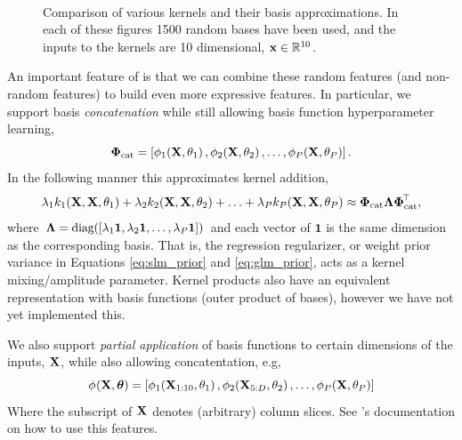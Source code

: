 \documentclass[11pt, oneside]{article}
\begin{document}
\begin{figure}[htb]
{        \label{fig:matern32}
    }
    \\
    \caption{Comparison of various kernels and their basis approximations. In
        each of these figures 1500 random bases have been used, and the inputs
        to the kernels are 10 dimensional, $\inss \in \real{10}$.}
    \label{fig:kerns}
\end{figure}

An important feature of \revrand{} is that we can combine these random features
(and non-random features) to build even more expressive features. In
particular, we support basis \emph{concatenation} while still allowing basis
function hyperparameter learning,
\begin{equation}
    \feat_{\text{cat}} = \sbrac{
        \func{\featsym}{\ins, \param_1}{1},
        \func{\featsym}{\ins, \param_2}{2},
        \ldots,
        \func{\featsym}{\ins, \param_P}{P}
    }.
\end{equation}
In the following manner this approximates kernel addition,
\begin{equation}
    \reg_1 \kernl_1\!\brac{\ins, \ins, \param_1} +
    \reg_2 \kernl_2\!\brac{\ins, \ins, \param_2} + \ldots +
    \reg_P \kernl_P\!\brac{\ins, \ins, \param_P} \approx
    \feat_{\text{cat}} \Reg \feat_{\text{cat}}\T,
\end{equation}
where $\Reg = \diag{\sbrac{\reg_1 \mathbf{1}, \reg_2 \mathbf{1}, \ldots, \reg_P
        \mathbf{1}}}$ and each vector of $\mathbf{1}$ is the same dimension as
the corresponding basis. That is, the regression regularizer, or weight prior
variance in Equations \eqref{eq:slm_prior} and \eqref{eq:glm_prior}, acts as a
kernel mixing/amplitude parameter.  Kernel products also have an equivalent
representation with basis functions (outer product of bases), however we have
not yet implemented this.

We also support \emph{partial application} of basis functions to certain
dimensions of the inputs, $\ins$, while also allowing concatentation, e.g,
\begin{equation}
    \func{\featsym}{\ins, \boldsymbol\param}{} = \sbrac{
        \func{\featsym}{\ins_{1:10}, \param_1}{1},
        \func{\featsym}{\ins_{5:D}, \param_2}{2},
        \ldots,
        \func{\featsym}{\ins, \param_P}{P}
    } 
\end{equation}
Where the subscript of $\ins$ denotes (arbitrary) column slices. See
\revrand{}'s documentation on how to use this features.
\end{document}
